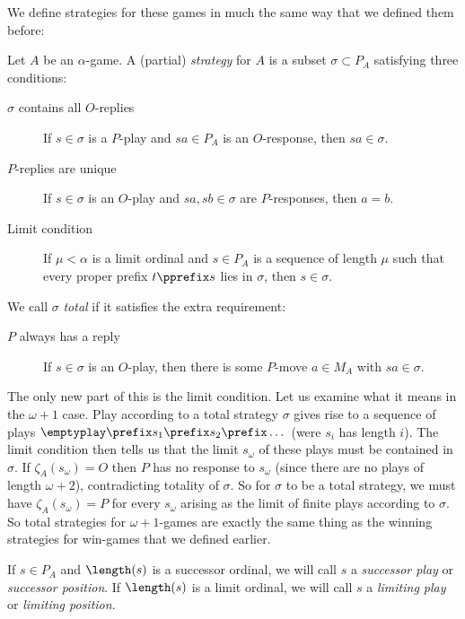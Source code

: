 \documentclass[11pt]{article} %
\begin{document}
We define strategies for these games in much the same way that we defined them before:

\begin{definition}
  Let $A$ be an $\alpha$-game.  A (partial) \emph{strategy} for $A$ is a subset $\sigma\subset P_A$ satisfying three conditions:
  \begin{description}
    \item[$\sigma$ contains all $O$-replies] If $s\in\sigma$ is a $P$-play and $sa\in P_A$ is an $O$-response, then $sa\in\sigma$.
    \item[$P$-replies are unique] If $s\in\sigma$ is an $O$-play and $sa,sb\in\sigma$ are $P$-responses, then $a=b$.
    \item[Limit condition] If $\mu<\alpha$ is a limit ordinal and $s\in P_A$ is a sequence of length $\mu$ such that every proper prefix $t\pprefix s$ lies in $\sigma$, then $s\in\sigma$.
  \end{description}

  We call $\sigma$ \emph{total} if it satisfies the extra requirement:

  \begin{description}
    \item[$P$ always has a reply] If $s\in\sigma$ is an $O$-play, then there is some $P$-move $a\in M_A$ with $sa\in\sigma$.
  \end{description}
\end{definition}

The only new part of this is the limit condition.  Let us examine what it means in the $\omega+1$ case.  Play according to a total strategy $\sigma$ gives rise to a sequence of plays $\emptyplay \prefix s_1\prefix s_2\prefix\dots$ (were $s_i$ has length $i$).  The limit condition then tells us that the limit $s_\omega$ of these plays must be contained in $\sigma$.  If $\zeta_A(s_\omega)=O$ then $P$ has no response to $s_\omega$ (since there are no plays of length $\omega+2$), contradicting totality of $\sigma$.  So for $\sigma$ to be a total strategy, we must have $\zeta_A(s_\omega)=P$ for every $s_\omega$ arising as the limit of finite plays according to $\sigma$.  So total strategies for $\omega+1$-games are exactly the same thing as the winning strategies for win-games that we defined earlier.  

If $s\in P_A$ and $\length(s)$ is a successor ordinal, we will call $s$ a \emph{successor play} or \emph{successor position}.  If $\length(s)$ is a limit ordinal, we will call $s$ a \emph{limiting play} or \emph{limiting position}.
\end{document}
